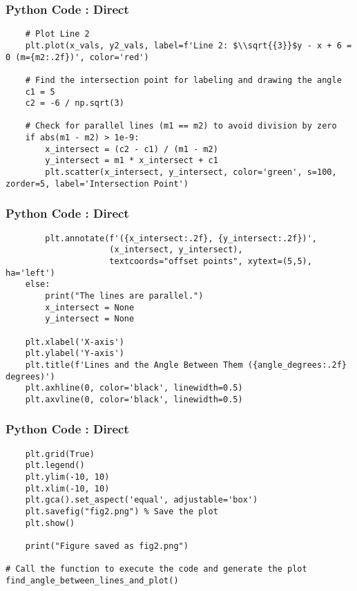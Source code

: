 \documentclass{beamer}
\begin{document}
\begin{frame}[fragile]
\frametitle{Python Code : Direct}

\begin{lstlisting}
    # Plot Line 2
    plt.plot(x_vals, y2_vals, label=f'Line 2: $\\sqrt{{3}}$y - x + 6 = 0 (m={m2:.2f})', color='red')

    # Find the intersection point for labeling and drawing the angle
    c1 = 5
    c2 = -6 / np.sqrt(3)
    
    # Check for parallel lines (m1 == m2) to avoid division by zero
    if abs(m1 - m2) > 1e-9: 
        x_intersect = (c2 - c1) / (m1 - m2)
        y_intersect = m1 * x_intersect + c1
        plt.scatter(x_intersect, y_intersect, color='green', s=100, zorder=5, label='Intersection Point')
        \end{lstlisting}

\end{frame}
\begin{frame}[fragile]
\frametitle{Python Code : Direct}

\begin{lstlisting}
        plt.annotate(f'({x_intersect:.2f}, {y_intersect:.2f})', 
                     (x_intersect, y_intersect), 
                     textcoords="offset points", xytext=(5,5), ha='left')
    else:
        print("The lines are parallel.")
        x_intersect = None
        y_intersect = None

    plt.xlabel('X-axis')
    plt.ylabel('Y-axis')
    plt.title(f'Lines and the Angle Between Them ({angle_degrees:.2f} degrees)')
    plt.axhline(0, color='black', linewidth=0.5)
    plt.axvline(0, color='black', linewidth=0.5)
    \end{lstlisting}

\end{frame}
\begin{frame}[fragile]
\frametitle{Python Code : Direct}

\begin{lstlisting}
    plt.grid(True)
    plt.legend()
    plt.ylim(-10, 10)
    plt.xlim(-10, 10)
    plt.gca().set_aspect('equal', adjustable='box')
    plt.savefig("fig2.png") % Save the plot
    plt.show()

    print("Figure saved as fig2.png")

# Call the function to execute the code and generate the plot
find_angle_between_lines_and_plot()
\end{lstlisting}
\end{frame}
\end{document}
